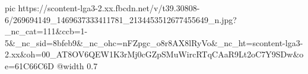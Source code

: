  
 
 
 
 

\ifcmt
  pic https://scontent-lga3-2.xx.fbcdn.net/v/t39.30808-6/269694149_1469637333411781_2134453512677455649_n.jpg?_nc_cat=111&ccb=1-5&_nc_sid=8bfeb9&_nc_ohc=nFZpgc_o8r8AX8lRyVo&_nc_ht=scontent-lga3-2.xx&oh=00_AT8OV6QEW1K3rMj0cGZpSMuWircRTqCAaR9Lt2oC7Y9SDw&oe=61C66C6D
  @width 0.7
\fi

